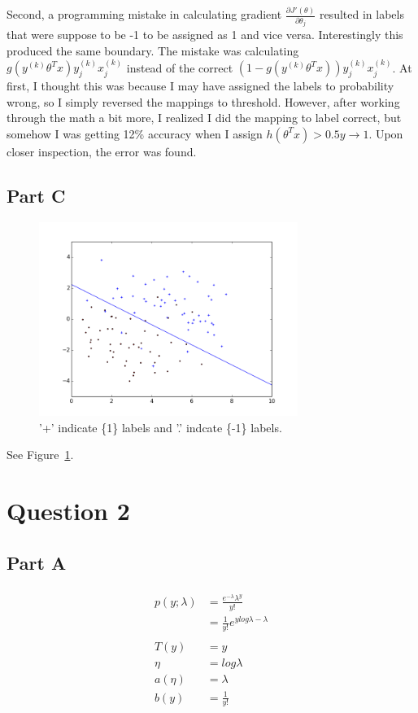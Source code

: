 \documentclass[11pt]{article}
\begin{document}
Second, a programming mistake in calculating gradient 
$\frac{\partial J'(\theta)}{\partial \theta_j}$ resulted in labels that were suppose to 
be {-1} to be assigned as {1} and vice versa. Interestingly this produced the same 
boundary. The mistake was calculating $g(y^{(k)}\theta^Tx)y_j^{(k)}x_j^{(k)}$ instead of 
the correct $(1-g(y^{(k)}\theta^Tx))y_j^{(k)}x_j^{(k)}$. At first, I thought this was 
because I may have assigned the labels to probability wrong, so I simply reversed the
mappings to threshold. However, after working through the math a bit more, I realized 
I did the mapping to label correct, but somehow I was getting 12\% accuracy when I assign 
$h(\theta^Tx)>0.5 y\rightarrow1$. Upon closer inspection, the error was found.

\subsection*{Part C}
\begin{figure}
	\centering
\includegraphics[width=0.75\textwidth]{../p1.png}
	\caption{ '+' indicate \{1\} labels and '.' indcate \{-1\} labels.}
	\label{fig:1c}
\end{figure}

See Figure~\ref{fig:1c}.

\section*{Question 2}
\subsection*{Part A}
\begin{align}
	\begin{split}
	p(y; \lambda) &= \frac{e^{-\lambda}\lambda^y}{y!} \\
	              &= \frac{1}{y!}e^{ylog\lambda-\lambda} \\
	 \\
	 T(y) &= y \\
	 \eta &= log\lambda \\
	 a(\eta) &= \lambda \\
	 b(y) &= \frac{1}{y!}
	\end{split}
\end{align}
\end{document}

